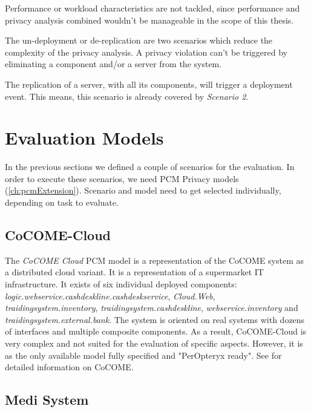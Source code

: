 Performance or workload characteristics are not tackled, since performance and privacy analysis combined wouldn't be manageable in the scope of this thesis.

The un-deployment or de-replication are two scenarios which reduce the complexity of the privacy analysis. A privacy violation can't be triggered by eliminating a component and/or a server from the system.

The replication of a server, with all its components, will trigger a deployment event. This means, this scenario is already covered by \textit{Scenario 2}.


\section{Evaluation Models}
\label{sec:Evaluation:models}

In the previous sections we defined a couple of scenarios for the evaluation. In order to execute these scenarios, we need PCM Privacy models (\autoref{ch:pcmExtension}). Scenario and model need to get selected individually, depending on task to evaluate.

\subsection{CoCOME-Cloud}
\label{sec:eval:models:cocome}

The \textit{CoCOME Cloud} PCM model is a representation of the CoCOME system as a distributed cloud variant. It is a representation of a supermarket IT infrastructure. It exists of six individual deployed components:  \textit{logic.webservice.cashdeskline.cashdeskservice}, \textit{Cloud.Web}, \textit{traidingsystem.inventory}, \textit{traidingsystem.cashdeskline}, \textit{webservice.inventory} and \textit{traidingsystem.external.bank}. The system is oriented on real systems with dozens of interfaces and multiple composite components. As a result, CoCOME-Cloud is very complex and not suited for the evaluation of specific aspects. However, it is as the only available model fully specified and "PerOpteryx ready". See \cite{Heinrich.2015} for detailed information on CoCOME.


\subsection{Medi System}
\label{sec:eval:models:medSys}

